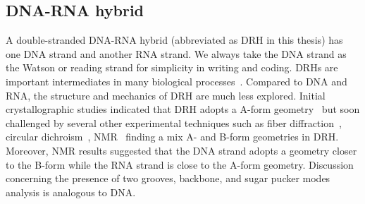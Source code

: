 \subsection{DNA-RNA hybrid}\label{c1:s2:sb4}
A double-stranded DNA-RNA hybrid (abbreviated as DRH in this thesis) has one DNA strand and another RNA strand.
We always take the DNA strand as the Watson or reading strand for simplicity in writing and coding.
DRHs are important intermediates in many biological processes~\cite{adams2012biochemistry,vella1994molecular,rich1960hybrid,brambati2020dark,meselson1958replication,shaw2008recognition}. 
Compared to DNA and RNA, the structure and mechanics of DRH are much less explored.
Initial crystallographic studies indicated that DRH adopts a A-form geometry~\cite{wang1982molecular} but soon challenged by several other experimental techniques such as fiber diffraction~\cite{zimmerman1981rna}, circular dichroism~\cite{roberts1992stability},  NMR~\cite{gao1994sequence,lane1993nmr,fedoroff1997solution,szyperski1999nmr} finding a mix A- and B-form geometries in DRH. 
Moreover, NMR results suggested that the DNA strand adopts a geometry closer to the B-form while the RNA strand is close to the A-form geometry.
Discussion concerning the presence of two grooves, backbone, and sugar pucker modes analysis is analogous to DNA. 

